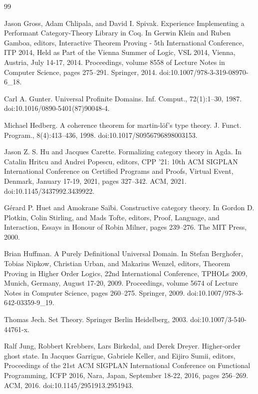\documentclass[10pt,a4paper]{article}
\begin{document}
\begin{thebibliography}{99}
\par\noindent    Jason Gross, Adam Chlipala, and David I. Spivak.  Experience Implementing a Performant Category-Theory Library in Coq.  In Gerwin Klein and Ruben Gamboa, editors, Interactive Theorem Proving - 5th International Conference, ITP 2014, Held as Part of the Vienna Summer of Logic, VSL 2014, Vienna, Austria, July 14-17, 2014. Proceedings, volume 8558 of Lecture Notes in Computer Science, pages 275–291. Springer, 2014.  doi:10.1007/978-3-319-08970-6\_18.  

\par\noindent    Carl A. Gunter.  Universal Profinite Domains.  Inf. Comput., 72(1):1–30, 1987.  doi:10.1016/0890-5401(87)90048-4.  

\par\noindent    Michael Hedberg.  A coherence theorem for martin-löf’s type theory.  J. Funct. Program., 8(4):413–436, 1998.  doi:10.1017/S0956796898003153.  

\par\noindent    Jason Z. S. Hu and Jacques Carette.  Formalizing category theory in Agda.  In Catalin Hritcu and Andrei Popescu, editors, CPP ’21: 10th ACM SIGPLAN International Conference on Certified Programs and Proofs, Virtual Event, Denmark, January 17-19, 2021, pages 327–342. ACM, 2021.  doi:10.1145/3437992.3439922.  

\par\noindent    Gérard P. Huet and Amokrane Saïbi.  Constructive category theory.  In Gordon D. Plotkin, Colin Stirling, and Mads Tofte, editors, Proof, Language, and Interaction, Essays in Honour of Robin Milner, pages 239–276. The MIT Press, 2000.  

\par\noindent    Brian Huffman.  A Purely Definitional Universal Domain.  In Stefan Berghofer, Tobias Nipkow, Christian Urban, and Makarius Wenzel, editors, Theorem Proving in Higher Order Logics, 22nd International Conference, TPHOLs 2009, Munich, Germany, August 17-20, 2009. Proceedings, volume 5674 of Lecture Notes in Computer Science, pages 260–275. Springer, 2009.  doi:10.1007/978-3-642-03359-9\_19.  

\par\noindent    Thomas Jech.  Set Theory.  Springer Berlin Heidelberg, 2003.  doi:10.1007/3-540-44761-x.  

\par\noindent    Ralf Jung, Robbert Krebbers, Lars Birkedal, and Derek Dreyer.  Higher-order ghost state.  In Jacques Garrigue, Gabriele Keller, and Eijiro Sumii, editors, Proceedings of the 21st ACM SIGPLAN International Conference on Functional Programming, ICFP 2016, Nara, Japan, September 18-22, 2016, pages 256–269. ACM, 2016.  doi:10.1145/2951913.2951943.  


\end{thebibliography}
\end{document}

